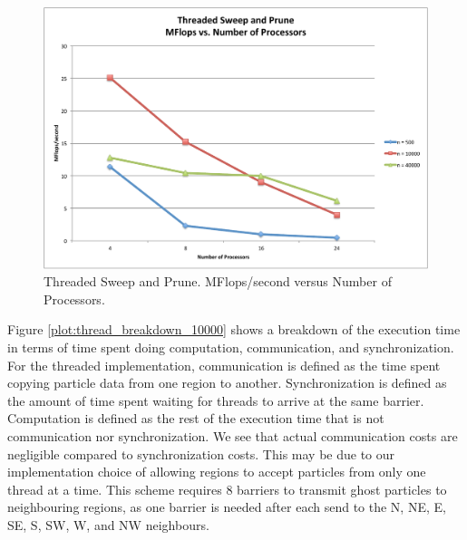 \documentclass[11pt]{article} %
\begin{document}
\begin{figure}
\begin{centering}
\includegraphics[width=0.5\paperwidth]{figures/thread_flops_v_p}
\par\end{centering}

\caption{Threaded Sweep and Prune. MFlops/second versus Number of Processors.}
\label{plot:thread_flops_v_p}
\end{figure}


Figure \ref{plot:thread_breakdown_10000} shows a breakdown of the
execution time in terms of time spent doing computation, communication,
and synchronization. For the threaded implementation, communication
is defined as the time spent copying particle data from one region
to another. Synchronization is defined as the amount of time spent
waiting for threads to arrive at the same barrier. Computation is
defined as the rest of the execution time that is not communication
nor synchronization. We see that actual communication costs are negligible
compared to synchronization costs. This may be due to our implementation
choice of allowing regions to accept particles from only one thread
at a time. This scheme requires 8 barriers to transmit ghost particles
to neighbouring regions, as one barrier is needed after each send
to the N, NE, E, SE, S, SW, W, and NW neighbours. 
\end{document}

